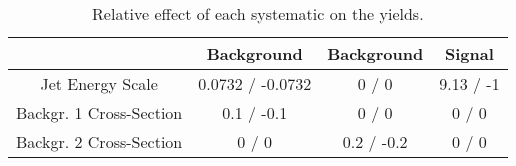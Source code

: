 \documentclass[10pt]{article}
\begin{document}
\begin{table}[htbp]
\begin{center}
\begin{tabular}{|c|c|c|c|}
\hline 
      & Background      & Background      & Signal \\ 
\hline 
  Jet Energy Scale & 0.0732 / -0.0732 & 0 / 0 & 9.13 / -1 \\ 
  Backgr. 1 Cross-Section & 0.1 / -0.1 & 0 / 0 & 0 / 0 \\ 
  Backgr. 2 Cross-Section & 0 / 0 & 0.2 / -0.2 & 0 / 0 \\ 
\hline 
\end{tabular} 
\caption{Relative effect of each systematic on the yields.} 
\end{center} 
\end{table} 
\end{document}
